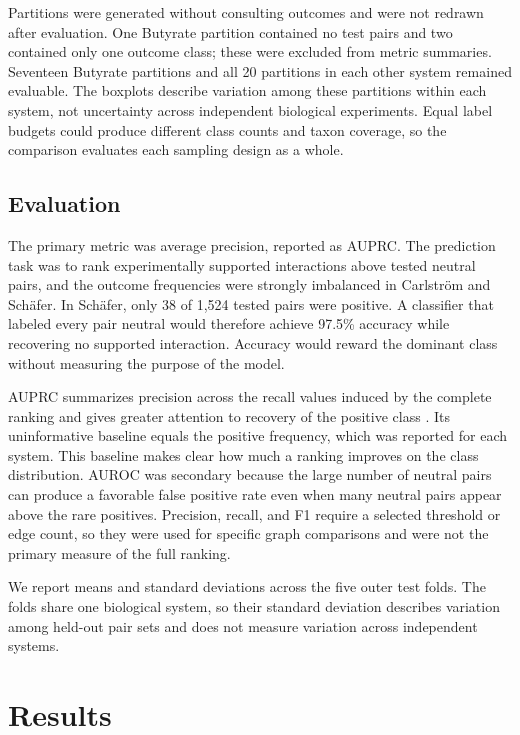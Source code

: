 \documentclass[11pt]{article}
\begin{document}
Partitions were generated without consulting outcomes and were not redrawn after evaluation.
One Butyrate partition contained no test pairs and two contained only one outcome class; these were excluded from metric summaries.
Seventeen Butyrate partitions and all 20 partitions in each other system remained evaluable.
The boxplots describe variation among these partitions within each system, not uncertainty across independent biological experiments.
Equal label budgets could produce different class counts and taxon coverage, so the comparison evaluates each sampling design as a whole.

\subsection{Evaluation}

The primary metric was average precision, reported as AUPRC.
The prediction task was to rank experimentally supported interactions above tested neutral pairs, and the outcome frequencies were strongly imbalanced in Carlstr\"om and Sch\"afer.
In Sch\"afer, only 38 of 1,524 tested pairs were positive.
A classifier that labeled every pair neutral would therefore achieve 97.5\% accuracy while recovering no supported interaction.
Accuracy would reward the dominant class without measuring the purpose of the model.

AUPRC summarizes precision across the recall values induced by the complete ranking and gives greater attention to recovery of the positive class \citep{saito2015}.
Its uninformative baseline equals the positive frequency, which was reported for each system.
This baseline makes clear how much a ranking improves on the class distribution.
AUROC was secondary because the large number of neutral pairs can produce a favorable false positive rate even when many neutral pairs appear above the rare positives.
Precision, recall, and F1 require a selected threshold or edge count, so they were used for specific graph comparisons and were not the primary measure of the full ranking.

We report means and standard deviations across the five outer test folds.
The folds share one biological system, so their standard deviation describes variation among held-out pair sets and does not measure variation across independent systems.

\section{Results}
\end{document}
